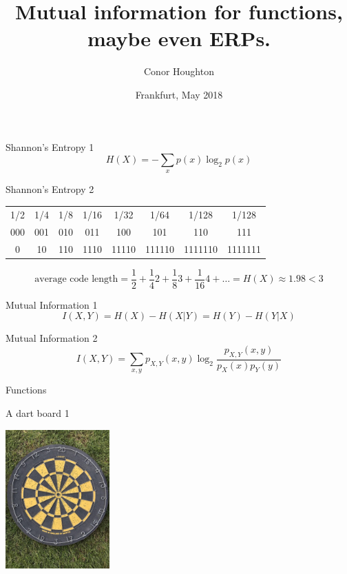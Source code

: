 \documentclass{beamer}
\title[Mutual information for functions.]{Mutual information for functions, maybe even ERPs.}
\author{Conor Houghton}
\institute{CS, U Bristol}
\date{Frankfurt, May 2018}
\begin{document}
\maketitle



\begin{frame}{Shannon's Entropy 1}
\color{dark}
$$
H(X)=-\sum_x p(x)\log_2{p(x)}
$$
\color{black}
\end{frame}



\begin{frame}{Shannon's Entropy 2}
\color{black}
\begin{center}
\begin{tabular}{cccccccc}
1/2&1/4&1/8&1/16&1/32&1/64&1/128&1/128\\
000&001&010&011&100&101&110&111\\
0&10&110&1110&11110&111110&1111110&1111111
\end{tabular}
\end{center}
\color{dark}
$$
\mbox{average code length}=\frac{1}{2}+\frac{1}{4}2+\frac{1}{8}3+\frac{1}{16}4+\ldots = H(X)\approx 1.98 < 3
$$
\color{black}
\end{frame}


\begin{frame}{Mutual Information 1}
\color{dark}
$$
I(X,Y)=H(X)-H(X|Y)=H(Y)-H(Y|X)
$$
\color{black}
\end{frame}


\begin{frame}{Mutual Information 2}
\color{dark}
$$
I(X,Y)=\sum_{x,y} p_{X,Y}(x,y) \log_2{\frac{p_{X,Y}(x,y)}{p_X(x)p_Y(y)}}
$$
\color{black}
\end{frame}

\begin{frame}{Functions}
\color{reddish}
\begin{center}

\end{center}
\end{frame}

\begin{frame}{A dart board 1}
\color{reddish}
\begin{center}
\includegraphics[width=4cm]{dart_board.jpg}
\end{center}
\color{black}
\vfill
\color{gray}
\color{black}
\end{frame}
\end{document}
